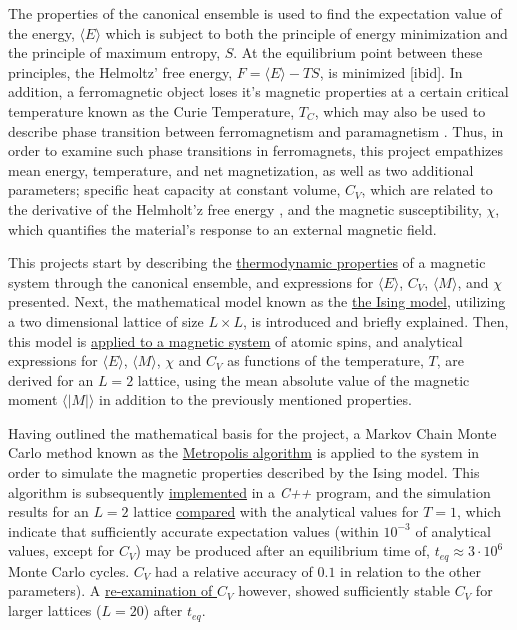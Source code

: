 \documentclass[%
oneside,                 %
final,                   %
10pt]{article}
\begin{document}
The properties of the canonical ensemble is used to find the expectation value of the energy, $\langle E \rangle$ which is subject to both the principle of energy minimization and the principle of maximum entropy, $S$. At the equilibrium point between these principles, the Helmoltz' free energy, $F=\langle E \rangle-TS$, is minimized [ibid]. In addition, a ferromagnetic object loses it's magnetic properties at a certain critical temperature known as the Curie Temperature, $T_C$, which may also be used to describe phase transition between ferromagnetism and paramagnetism \cite{FeynmanFM}. Thus, in order to examine such phase transitions in ferromagnets, this project empathizes mean energy, temperature, and net magnetization, as well as two additional parameters; specific heat capacity at constant volume, $C_V$, which are related to the derivative of the Helmholt'z free energy \cite{HJ-SP}, and the magnetic susceptibility, $\chi$, which quantifies the material's response to an external magnetic field. \newline


This projects start by describing the \hyperref[SS:thermodynamic.properties]{thermodynamic properties} of a magnetic system through the canonical ensemble, and expressions for $\langle E \rangle $, $C_V$, $\langle M \rangle $, and $\chi$ presented. Next, the mathematical model known as the \hyperref[SS:Ising]{the Ising model}, utilizing a two dimensional lattice of size $L \times L$, is introduced and briefly explained. Then, this model is \hyperref[SS:M.Model_application]{applied to a magnetic system} of atomic spins, and analytical expressions for $\langle E \rangle$, $\langle M \rangle$, $\chi$ and $C_V$ as functions of the temperature, $T$, are derived for an $L=2$ lattice, using the mean absolute value of the magnetic moment  $\langle |M| \rangle$ in addition to the previously mentioned properties.  \newline

Having outlined the mathematical basis for the project, a Markov Chain Monte Carlo method known as the \hyperref[SS:MCMCmethod]{Metropolis algorithm} is  applied to the system in order to simulate the magnetic properties described by the Ising model. This algorithm is subsequently \hyperref[SS:init.algo.impl]{implemented} in a \textit{C++} program, and the simulation results for an $L=2$ lattice \hyperref[SS:R.initialeval]{compared} with the analytical values for $T=1$, which indicate that sufficiently accurate expectation values (within $10^{-3}$ of analytical values, except for $C_V$) may be produced after an equilibrium time of, $t_{eq} \approx 3 \cdot 10^6$ Monte Carlo cycles. $C_V$ had a relative accuracy of $0.1$ in relation to the other parameters). A \hyperref[SS:M.Eq.time]{re-examination of $C_V$} however, showed sufficiently stable $C_V$ for larger lattices ($L=20$) after $t_{eq}$. \newline
\end{document}
